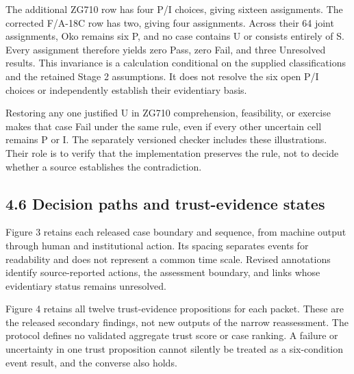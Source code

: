 \documentclass[11pt]{article}
\begin{document}
The additional ZG710 row has four P/I choices, giving sixteen assignments. The corrected F/A-18C row has two, giving four assignments. Across their 64 joint assignments, Oko remains six P, and no case contains U or consists entirely of S. Every assignment therefore yields zero Pass, zero Fail, and three Unresolved results. This invariance is a calculation conditional on the supplied classifications and the retained Stage 2 assumptions. It does not resolve the six open P/I choices or independently establish their evidentiary basis.

Restoring any one justified U in ZG710 comprehension, feasibility, or exercise makes that case Fail under the same rule, even if every other uncertain cell remains P or I. The separately versioned checker includes these illustrations. Their role is to verify that the implementation preserves the rule, not to decide whether a source establishes the contradiction.

\subsection*{4.6 Decision paths and trust-evidence states}

Figure 3 retains each released case boundary and sequence, from machine output through human and institutional action. Its spacing separates events for readability and does not represent a common time scale. Revised annotations identify source-reported actions, the assessment boundary, and links whose evidentiary status remains unresolved.

Figure 4 retains all twelve trust-evidence propositions for each packet. These are the released secondary findings, not new outputs of the narrow reassessment. The protocol defines no validated aggregate trust score or case ranking. A failure or uncertainty in one trust proposition cannot silently be treated as a six-condition event result, and the converse also holds.
\end{document}
